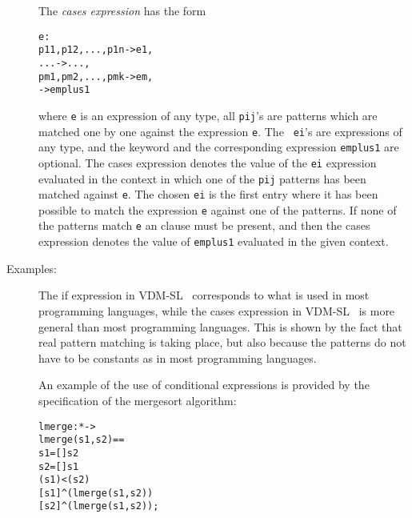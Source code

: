 \documentclass[\pformat,12pt]{article}
\newcommand{\vdmslpp}[2]{%
#1
}
\newcommand{\vdmsl}{VDM-SL}
\newcommand{\vdmpp}{VDM++}
\begin{document}
\begin{description}
  The {\it cases expression} has the form
  \begin{alltt}
     e :
      p11, p12, ..., p1n -> e1,
      ...                -> ...,
      pm1, pm2, ..., pmk -> em,
                   -> emplus1
  \end{alltt}
  where {\tt e} is an expression of any type, all {\tt pij}'s are patterns
  which are matched one by one against the expression {\tt e}.  The {\tt
    ei}'s are expressions of any type, and the keyword  and
  the corresponding expression {\tt emplus1} are optional. The cases
  expression denotes the value of the {\tt ei} expression evaluated in the
  context in which one of the {\tt pij} patterns has been matched against
  {\tt e}. The chosen {\tt ei} is the first entry where it has been
  possible to match the expression {\tt e} against one of the patterns. If
  none of the patterns match {\tt e} an  clause must be
  present, and then the cases expression denotes the value of {\tt emplus1}
  evaluated in the given context.
     
\item[Examples:] The if expression in \vdmslpp{\vdmsl}{\vdmpp}\ 
  corresponds to what is used in most programming languages, while the
  cases expression in \vdmslpp{\vdmsl}{\vdmpp}\ is more general than
  most programming languages. This is shown by the fact that real
  pattern matching is taking place, but also because the patterns do not
  have to be constants as in most programming languages.

  An example of the use of conditional expressions is provided by the
  specification of the mergesort algorithm:
  \begin{alltt}
  lmerge :  *  -> 
  lmerge (s1,s2) ==
     s1 = []  s2
     s2 = []  s1
    \keyw{elseif} ( s1) < ( s2)
    \keyw{then} [ s1]\verb+^+(lmerge ( s1, s2))
    \keyw{else} [\keyw{hd} s2]\verb+^+(lmerge (s1, \keyw{tl} s2));


\end{alltt}
\end{description}
\end{document}
